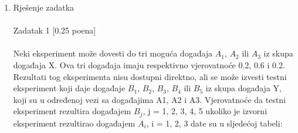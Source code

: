 \documentclass[12pt]{article}
\begin{document}
    
	\begin{enumerate}
		\item Rješenje zadatka \\
		\\
		Zadatak 1 [0.25 poena] \\
        \\
Neki eksperiment može dovesti do tri moguća događaja $A_1$, $A_2$ ili $A_3$ iz skupa događaja X. Ova tri događaja imaju respektivno vjerovatnoće 0.2, 0.6 i 0.2. Rezultati tog eksperimenta nisu dostupni direktno, ali se može izvesti testni eksperiment koji daje događaje $B_1$, $B_2$, $B_3$, $B_4$ ili $B_5$ iz skupa događaja Y, koji su u određenoj vezi sa događajima A1, A2 i A3. Vjerovatnoće da testni eksperiment rezultira događajem $B_j$, j = 1, 2, 3, 4, 5 ukoliko je izvorni eksperiment rezultirao događajem $A_i$, i = 1, 2, 3 date su u sljedećoj tabeli: \\


\end{enumerate}
\end{document}
